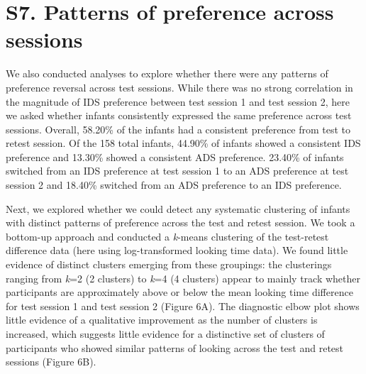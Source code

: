 \documentclass[
  man, donotrepeattitle,floatsintext]{apa6}
\begin{document}
\newpage

\hypertarget{s7.-patterns-of-preference-across-sessions}{%
\section{S7. Patterns of preference across sessions}\label{s7.-patterns-of-preference-across-sessions}}

We also conducted analyses to explore whether there were any patterns of preference reversal across test sessions.
While there was no strong correlation in the magnitude of IDS preference between test session 1 and test session 2, here we asked whether infants consistently expressed the same preference across test sessions.
Overall, 58.20\% of the infants had a consistent preference from test to retest session.
Of the 158 total infants, 44.90\% of infants showed a consistent IDS preference and 13.30\% showed a consistent ADS preference.
23.40\% of infants switched from an IDS preference at test session 1 to an ADS preference at test session 2 and 18.40\% switched from an ADS preference to an IDS preference.

Next, we explored whether we could detect any systematic clustering of infants with distinct patterns of preference across the test and retest session.
We took a bottom-up approach and conducted a \emph{k}-means clustering of the test-retest difference data (here using log-transformed looking time data).
We found little evidence of distinct clusters emerging from these groupings: the clusterings ranging from \emph{k}=2 (2 clusters) to \emph{k}=4 (4 clusters) appear to mainly track whether participants are approximately above or below the mean looking time difference for test session 1 and test session 2 (Figure 6A).
The diagnostic elbow plot shows little evidence of a qualitative improvement as the number of clusters is increased, which suggests little evidence for a distinctive set of clusters of participants who showed similar patterns of looking across the test and retest sessions (Figure 6B).
\end{document}
